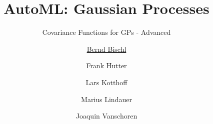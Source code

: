 



\newcommand{\lz}{\vspace{0.5cm}}
\newcommand{\thetab}{\bm{\weights}}
\newcommand{\zero}{\mathbf{0}}
\newcommand{\Xmat}{\mathbf{X}}
\newcommand{\ydat}{\mathbf{y}}
\newcommand{\id}{\boldsymbol{I}}
\newcommand{\Amat}{\mathbf{A}}
\newcommand{\Xspace}{\mathcal{X}}                                           
\newcommand{\Yspace}{\mathcal{Y}}
\newcommand{\ls}{\ell}
\newcommand{\natnum}{\mathbb{N}}
\newcommand{\intnum}{\mathbb{Z}}

\usepackage{fontawesome}
\usepackage{dirtytalk}
\usepackage{csquotes}



\title[AutoML: GPs]{AutoML: Gaussian Processes} %
\subtitle{Covariance Functions for GPs - Advanced} %
\author[Marius Lindauer]{\underline{Bernd Bischl} \and Frank Hutter \and Lars Kotthoff\newline \and Marius Lindauer \and Joaquin Vanschoren}
\institute{}
\date{}




\maketitle
	
